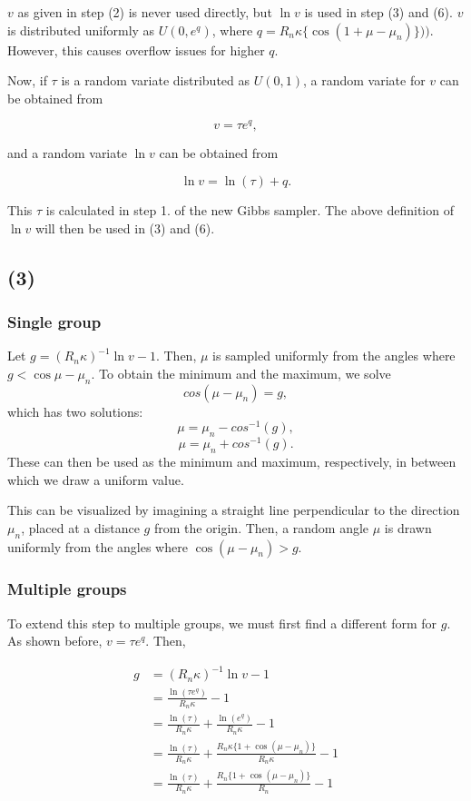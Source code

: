 \documentclass[12pt,a4paper]{article}
\begin{document}
$v$ as given in step (2) is never used directly, but $\ln v$ is used in  step (3) and (6). $v$ is distributed uniformly as $U(0, e^{q})$, where $q = R_n \kappa \{\cos(1 + \mu - \mu_n)\}))$. However, this causes overflow issues for higher $q$.

Now, if $\tau$ is a random variate distributed as $U(0,1)$, a random variate for $v$ can be obtained from 

$$ v = \tau e^{q},$$

and a random variate $ \ln v $ can be obtained from

$$ \ln v = \ln(\tau) + q.$$

This $\tau$ is calculated in step 1. of the new Gibbs sampler. The above definition of $\ln v$ will then be used in (3) and (6). 

\subsection{(3)}

\subsubsection*{Single group}
Let $g = (R_n \kappa)^{-1} \ln v - 1 $. Then, $\mu$ is sampled uniformly from the angles where $g < \cos{\mu - \mu_n}$. To obtain the minimum and the maximum, we solve
$$ cos(\mu - \mu_n) = g,$$
which has two solutions:
$$ \mu = \mu_n - cos^{-1}(g),$$
$$ \mu = \mu_n + cos^{-1}(g).$$
These can then be used as the minimum and maximum, respectively, in between which we draw a uniform value. 

This can be visualized by imagining a straight line perpendicular to the direction $\mu_n$, placed at a distance $g$ from the origin. Then, a random angle $\mu$ is drawn uniformly from the angles where $\cos{(\mu-\mu_n)} > g$.

\subsubsection*{Multiple groups}

To extend this step to multiple groups, we must first find a different form for $g$. As shown before, $ v = \tau e^{q}$. Then,

\begin{align*}
g & = (R_n \kappa)^{-1} \ln v - 1 \\
& = \frac{\ln (\tau e^{q})}{R_n \kappa} - 1  \\
& = \frac{\ln (\tau)}{R_n \kappa} + \frac{\ln (e^{q})}{R_n \kappa} - 1  \\
& = \frac{\ln (\tau)}{R_n \kappa} + \frac{ R_n \kappa \{1 + \cos(\mu - \mu_n)\}}{R_n \kappa} - 1  \\
& = \frac{\ln (\tau)}{R_n \kappa} + \frac{ R_n \{1 + \cos(\mu - \mu_n)\}}{R_n } - 1 
\end{align*}
\end{document}
